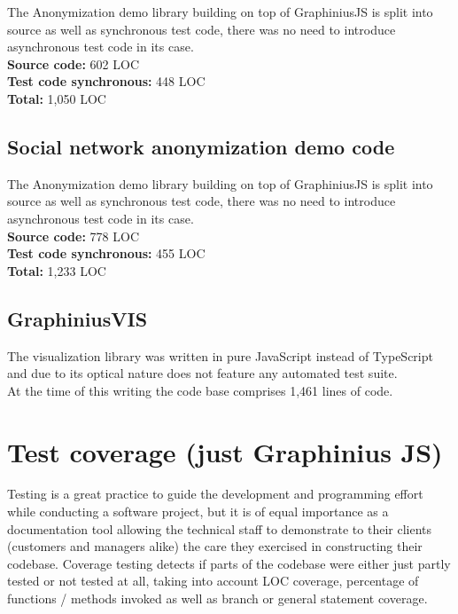 	The Anonymization demo library building on top of GraphiniusJS is split into source as well as synchronous test code, there was no need to introduce asynchronous test code in its case.\\	
	\textbf{Source code:} 602 LOC \\
	\textbf{Test code synchronous:} 448 LOC \\	
	\textbf{Total:} 1,050 LOC	
	
	\subsection{Social network anonymization demo code}
	\label{ssect:metrics_graphinius_anonym}
	
	The Anonymization demo library building on top of GraphiniusJS is split into source as well as synchronous test code, there was no need to introduce asynchronous test code in its case.\\	
	\textbf{Source code:} 778 LOC \\
	\textbf{Test code synchronous:} 455 LOC \\	
	\textbf{Total:} 1,233 LOC	
	
	\subsection{GraphiniusVIS}
	\label{ssect:metrics_graphinius_vis}
	
	The visualization library was written in pure JavaScript instead of TypeScript and due to its optical nature does not feature any automated test suite. \\	
	At the time of this writing the code base comprises 1,461 lines of code.
	

\section{Test coverage (just Graphinius JS)}
\label{sect:test_coverage}

Testing is a great practice to guide the development and programming effort while conducting a software project, but it is of equal importance as a documentation tool allowing the technical staff to demonstrate to their clients (customers and managers alike) the care they exercised in constructing their codebase. Coverage testing detects if parts of the codebase were either just partly tested or not tested at all, taking into account LOC coverage, percentage of functions / methods invoked as well as branch or general statement coverage.

